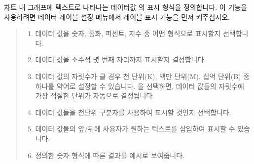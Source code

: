 \documentclass[letterpaper,10pt,english]{sphinxmanual}
\begin{document}
차트 내 그래프에 텍스트로 나타나는 데이터값 의 표시 형식을 정의합니다. 이 기능을 사용하려면 데이터 레이블 설정 메뉴에서 레이블 표시 기능을 먼저 켜주십시오.
\begin{quote}

\begin{figure}[H]
\centering

\noindent{}
\end{figure}
\begin{enumerate}
\def\theenumi{\arabic{enumi}}
\def\labelenumi{\theenumi .}
\makeatletter\def\p@enumii{\p@enumi \theenumi .}\makeatother
\item {} 
 데이터 값을 숫자, 통화, 퍼센트, 지수 중 어떤 형식으로 표시할지 선택합니다.

\item {} 
 데이터 값을 소수점 몇 번째 자리까지 표시할지 결정합니다.

\item {} 
 데이터 값의 자릿수가 클 경우 천 단위(K), 백만 단위(M), 십억 단위(B) 중 하나를 약어로 설정할 수 있습니다. 을 선택하면, 데이터 값들의 자릿수에 가장 적절한 단위가 자동으로 결정됩니다.

\item {} 
 데이터 값들을 천단위 구분자를 사용하여 표시할 것인지 선택합니다.

\item {} 
 데이터 값들의 앞/뒤에 사용자가 원하는 텍스트를 삽입하여 표시할 수 있습니다.

\item {} 
 정의한 숫자 형식에 따른 결과를 예시로 보여줍니다.

\end{enumerate}
\end{quote}

\end{document}
